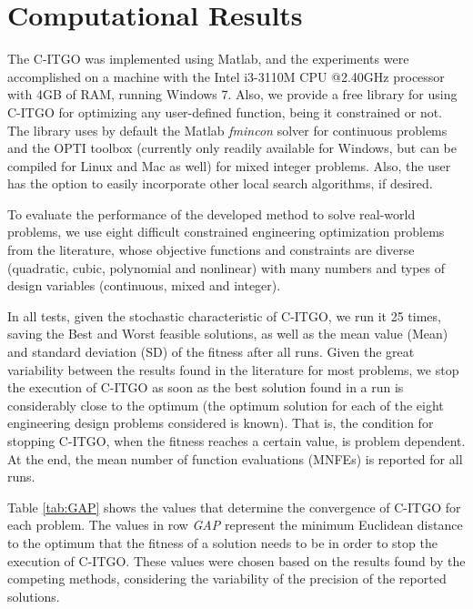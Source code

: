 \section{Computational Results} \label{sec:Results}

The C-ITGO was implemented using Matlab, and the experiments were accomplished on a machine with the Intel i3-3110M CPU @2.40GHz processor with 4GB of RAM, running Windows 7. Also, we provide a free library for using C-ITGO for optimizing any user-defined function, being it constrained or not. The library uses by default the Matlab \textit{fmincon} solver for continuous problems and the OPTI toolbox (currently only readily available for Windows, but can be compiled for Linux and Mac as well) for mixed integer problems. Also, the user has the option to easily incorporate other local search algorithms, if desired.


To evaluate the performance of the developed method to solve real-world problems, we use eight difficult constrained engineering optimization problems from the literature, whose objective functions and constraints are diverse (quadratic, cubic, polynomial and nonlinear) with many numbers and types of design variables (continuous, mixed and integer). 

In all tests, given the stochastic characteristic of C-ITGO, we run it 25 times, saving the Best and Worst feasible solutions, as well as the mean value (Mean) and standard deviation (SD) of the fitness after all runs. Given the great variability between the results found in the literature for most problems, we stop the execution of C-ITGO as soon as the best solution found in a run is considerably close to the optimum (the optimum solution for each of the eight engineering design problems considered is known). That is, the condition for stopping C-ITGO, when the fitness reaches a certain value, is problem dependent. At the end, the mean number of function evaluations (MNFEs) is reported for all runs.

Table \ref{tab:GAP} shows the values that determine the convergence of C-ITGO for each problem. The values in row \textit{GAP} represent the minimum Euclidean distance to the optimum that the fitness of a solution needs to be in order to stop the execution of C-ITGO. These values were chosen based on the results found by the competing methods, considering the variability of the precision of the reported solutions.


